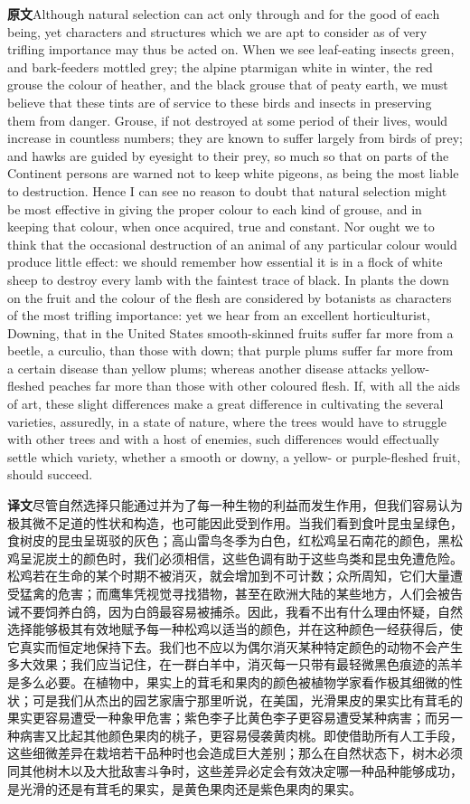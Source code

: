 \documentclass[UTF8,zihao=-4]{ctexart}
\newcommand{\BodyFont}{\fontsize{10.5pt}{15.5pt}\selectfont}
\newcommand{\origlabel}{\textbf{原文}\quad}
\newcommand{\translabel}{\textbf{译文}\quad}
\newenvironment{enblock}{\par\noindent\begingroup\BodyFont\origlabel}{\par\endgroup}
\newenvironment{zhblock}{\par\noindent\begingroup\BodyFont\translabel}{\par\endgroup\vspace{0.35em}}
\newcommand{\pair}[2]{\begin{enblock}#1\end{enblock}\begin{zhblock}#2\end{zhblock}}
\begin{document}
\pair{Although natural selection can act only through and for the good of each being, yet characters and structures which we are apt to consider as of very trifling importance may thus be acted on. When we see leaf-eating insects green, and bark-feeders mottled grey; the alpine ptarmigan white in winter, the red grouse the colour of heather, and the black grouse that of peaty earth, we must believe that these tints are of service to these birds and insects in preserving them from danger. Grouse, if not destroyed at some period of their lives, would increase in countless numbers; they are known to suffer largely from birds of prey; and hawks are guided by eyesight to their prey, so much so that on parts of the Continent persons are warned not to keep white pigeons, as being the most liable to destruction. Hence I can see no reason to doubt that natural selection might be most effective in giving the proper colour to each kind of grouse, and in keeping that colour, when once acquired, true and constant. Nor ought we to think that the occasional destruction of an animal of any particular colour would produce little effect: we should remember how essential it is in a flock of white sheep to destroy every lamb with the faintest trace of black. In plants the down on the fruit and the colour of the flesh are considered by botanists as characters of the most trifling importance: yet we hear from an excellent horticulturist, Downing, that in the United States smooth-skinned fruits suffer far more from a beetle, a curculio, than those with down; that purple plums suffer far more from a certain disease than yellow plums; whereas another disease attacks yellow-fleshed peaches far more than those with other coloured flesh. If, with all the aids of art, these slight differences make a great difference in cultivating the several varieties, assuredly, in a state of nature, where the trees would have to struggle with other trees and with a host of enemies, such differences would effectually settle which variety, whether a smooth or downy, a yellow- or purple-fleshed fruit, should succeed.}{尽管自然选择只能通过并为了每一种生物的利益而发生作用，但我们容易认为极其微不足道的性状和构造，也可能因此受到作用。当我们看到食叶昆虫呈绿色，食树皮的昆虫呈斑驳的灰色；高山雷鸟冬季为白色，红松鸡呈石南花的颜色，黑松鸡呈泥炭土的颜色时，我们必须相信，这些色调有助于这些鸟类和昆虫免遭危险。松鸡若在生命的某个时期不被消灭，就会增加到不可计数；众所周知，它们大量遭受猛禽的危害；而鹰隼凭视觉寻找猎物，甚至在欧洲大陆的某些地方，人们会被告诫不要饲养白鸽，因为白鸽最容易被捕杀。因此，我看不出有什么理由怀疑，自然选择能够极其有效地赋予每一种松鸡以适当的颜色，并在这种颜色一经获得后，使它真实而恒定地保持下去。我们也不应以为偶尔消灭某种特定颜色的动物不会产生多大效果；我们应当记住，在一群白羊中，消灭每一只带有最轻微黑色痕迹的羔羊是多么必要。在植物中，果实上的茸毛和果肉的颜色被植物学家看作极其细微的性状；可是我们从杰出的园艺家唐宁那里听说，在美国，光滑果皮的果实比有茸毛的果实更容易遭受一种象甲危害；紫色李子比黄色李子更容易遭受某种病害；而另一种病害又比起其他颜色果肉的桃子，更容易侵袭黄肉桃。即使借助所有人工手段，这些细微差异在栽培若干品种时也会造成巨大差别；那么在自然状态下，树木必须同其他树木以及大批敌害斗争时，这些差异必定会有效决定哪一种品种能够成功，是光滑的还是有茸毛的果实，是黄色果肉还是紫色果肉的果实。}
\end{document}
